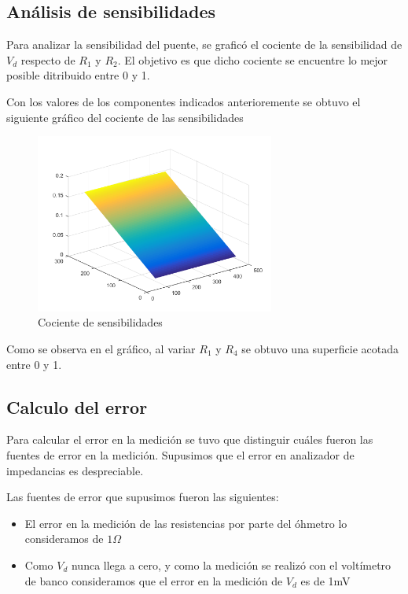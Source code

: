\documentclass[../../main.tex]{subfiles}
\begin{document}
\subsection{An\'alisis de sensibilidades}
Para analizar la sensibilidad del puente, se grafic\'o el cociente de la sensibilidad de $V_d$ respecto de $R_1$ y $R_2$.  El objetivo es que dicho cociente se encuentre lo mejor posible ditribuido entre 0 y 1.\par
Con los valores de los componentes indicados anterioremente se obtuvo el siguiente gr\'afico del cociente de las sensibilidades
\begin{figure}[H]	
	\centering
	\includegraphics[width=0.7\textwidth]{fotos/sen.png}
	\caption{Cociente de sensibilidades} 
\end{figure}
Como se observa en el gr\'afico, al variar $R_1$ y $R_4$ se obtuvo una superficie acotada entre 0 y 1.

\subsection{Calculo del error}
Para calcular el error en la medici\'on se tuvo que distinguir cu\'ales fueron las fuentes de error en la medici\'on. Supusimos que el error en analizador de impedancias es despreciable.\par
Las fuentes de error que supusimos fueron las siguientes:
\begin{itemize}  
\item El error en la medición de las resistencias por parte del \'ohmetro lo consideramos de $1\Omega$
\item Como $V_d$ nunca llega a cero, y como la medici\'on se realiz\'o con el volt\'imetro de banco consideramos que el error en la medici\'on de $V_d$ es de 1mV 
\end{itemize}
\end{document}
